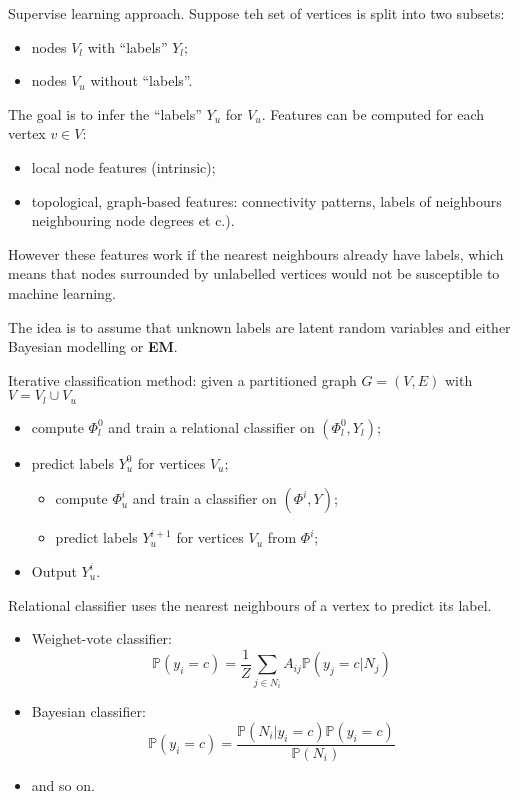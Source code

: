 \documentclass[a4paper]{article}
\newcommand{\pr}{\mathbb{P}}
\begin{document}
Supervise learning approach. Suppose teh set of vertices is split into two subsets:
\begin{itemize}
	\item nodes $V_l$ with ``labels'' $Y_l$;
	\item nodes $V_u$ without ``labels''.
\end{itemize}
The goal is to infer the ``labels'' $Y_u$ for $V_u$. Features can be computed for each
vertex $v\in V$: \begin{itemize}
	\item local node features (intrinsic);
	\item topological, graph-based features: connectivity patterns, labels of neighbours
	neighbouring node degrees et c.).
\end{itemize}
However these features work if the nearest neighbours already have labels, which means
that nodes surrounded by unlabelled vertices would not be susceptible to machine learning.

The idea is to assume that unknown labels are latent random variables and either Bayesian
modelling or \textbf{EM}.

Iterative classification method: given a partitioned graph $G=(V,E)$ with $V = V_l \cup V_u$
\begin{itemize}
	\item compute $\Phi_l^0$ and train a relational classifier on $(\Phi_l^0, Y_l)$;
	\item predict labels $Y^0_u$ for vertices $V_u$;
	\begin{itemize}
		\item compute $\Phi_u^i$ and train a classifier on $(\Phi^i, Y)$;
		\item predict labels $Y^{i+1}_u$ for vertices $V_u$ from $\Phi^i$;
	\end{itemize}
	\item Output $Y^i_u$.
\end{itemize}

Relational classifier uses the nearest neighbours of a vertex to predict its label.
\begin{itemize}
	\item Weighet-vote classifier: 
	\[\pr(y_i = c) = \frac{1}{Z} \sum_{j\in N_i} A_{ij} \pr(y_j=c|N_j)\]
	\item Bayesian classifier: 
		\[\pr(y_i = c) = \frac{\pr(N_i|y_i=c) \pr(y_i=c)}{\pr(N_i)}\]
	\item and so on.
\end{itemize}
\end{document}
